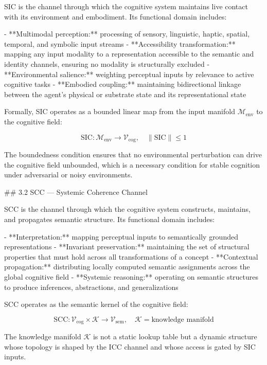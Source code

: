 SIC is the channel through which the cognitive system maintains live contact with
its environment and embodiment. Its functional domain includes:

- **Multimodal perception:** processing of sensory, linguistic, haptic, spatial,
  temporal, and symbolic input streams
- **Accessibility transformation:** mapping any input modality to a representation
  accessible to the semantic and identity channels, ensuring no modality is
  structurally excluded
- **Environmental salience:** weighting perceptual inputs by relevance to active
  cognitive tasks
- **Embodied coupling:** maintaining bidirectional linkage between the agent's
  physical or substrate state and its representational state

Formally, SIC operates as a bounded linear map from the input manifold
\(\mathcal{M}_{\text{env}}\) to the cognitive field:

\[
\mathrm{SIC}: \mathcal{M}_{\text{env}} \rightarrow \mathcal{V}_{\text{cog}}, \quad
\|\mathrm{SIC}\| \leq 1
\]

The boundedness condition ensures that no environmental perturbation can drive the
cognitive field unbounded, which is a necessary condition for stable cognition under
adversarial or noisy environments.

## 3.2 SCC — Systemic Coherence Channel

SCC is the channel through which the cognitive system constructs, maintains, and
propagates semantic structure. Its functional domain includes:

- **Interpretation:** mapping perceptual inputs to semantically grounded
  representations
- **Invariant preservation:** maintaining the set of structural properties that
  must hold across all transformations of a concept
- **Contextual propagation:** distributing locally computed semantic assignments
  across the global cognitive field
- **Systemic reasoning:** operating on semantic structures to produce inferences,
  abstractions, and generalizations

SCC operates as the semantic kernel of the cognitive field:

\[
\mathrm{SCC}: \mathcal{V}_{\text{cog}} \times \mathcal{K} \rightarrow
\mathcal{V}_{\text{sem}}, \quad \mathcal{K} = \text{knowledge manifold}
\]

The knowledge manifold \(\mathcal{K}\) is not a static lookup table but a dynamic
structure whose topology is shaped by the ICC channel and whose access is gated by
SIC inputs.

